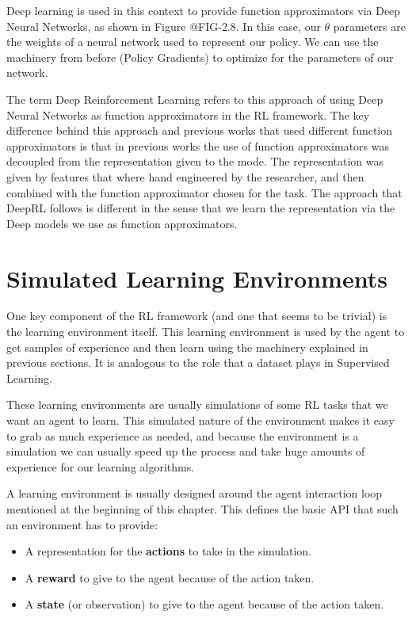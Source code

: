 Deep learning is used in this context to provide function approximators via Deep
Neural Networks, as shown in Figure @FIG-2.8. In this case, our $\theta$ parameters are the weights of a neural
network used to represent our policy. We can use the machinery from before (Policy Gradients)
to optimize for the parameters of our network.

\figRlPolicyParametrization

The term Deep Reinforcement Learning refers to this approach of using Deep Neural Networks
as function approximators in the RL framework. The key difference behind this approach
and previous works that used different function approximators is that in previous works
the use of function approximators was decoupled from the representation given to the mode.
The representation was given by features that where hand engineered by the researcher, and then
combined with the function approximator chosen for the task. The approach that DeepRL follows is 
different in the sense that we learn the representation via the Deep models we use as function approximators. 

\section{Simulated Learning Environments}

One key component of the RL framework (and one that seems to be trivial) is the learning
environment itself. This learning environment is used by the agent to get samples of
experience and then learn using the machinery explained in previous sections. It is analogous
to the role that a dataset plays in Supervised Learning.

These learning environments are usually simulations of some RL tasks that we want an
agent to learn. This simulated nature of the environment makes it easy to grab as much 
experience as needed, and because the environment is a simulation we can usually
speed up the process and take huge amounts of experience for our learning algorithms.

A learning environment is usually designed around the agent interaction loop mentioned
at the beginning of this chapter. This defines the basic API that such an environment
has to provide:

\begin{itemize}
    \item A representation for the \textbf{actions} to take in the simulation.
    \item A \textbf{reward} to give to the agent because of the action taken.
    \item A \textbf{state} (or observation) to give to the agent because of the action taken.
\end{itemize}

